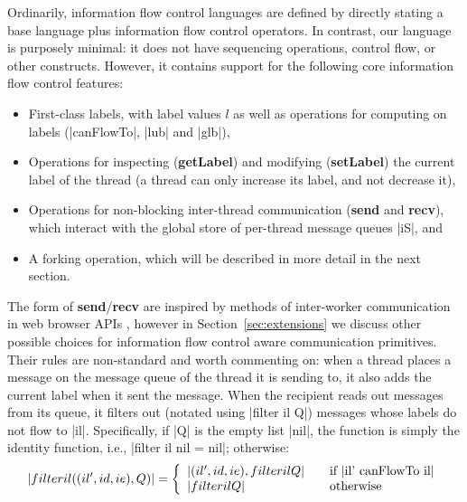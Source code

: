 Ordinarily, information flow control languages are defined by directly
stating a base language plus information flow control operators.  In
contrast, our language is purposely minimal: it does not have sequencing
operations, control flow, or other constructs.  However, it contains
support for the following core information flow control features:

\begin{itemize}
    \item First-class labels, with label values $l$ as well as operations for computing on
labels (|canFlowTo|, |lub| and |glb|),
    \item Operations for inspecting (\textbf{getLabel}) and modifying (\textbf{setLabel}) the current label of the thread (a thread can only increase its label, and not decrease it),
    \item Operations for non-blocking inter-thread communication (\textbf{send} and \textbf{recv}),
        which interact with the global store of per-thread message queues |iS|, and
    \item A forking operation, which will be described in more detail in the next section.
\end{itemize}

The form of \textbf{send}/\textbf{recv} are inspired by methods of inter-worker communication
in web browser APIs , however in Section~\ref{sec:extensions} we
discuss other possible choices for information flow control aware communication
primitives.  Their rules are non-standard and worth commenting on: when a thread places
a message on the message queue of the thread it is sending to, it also adds the current
label when it sent the message.  When the recipient reads out messages from its queue,
it filters out (notated using |filter il Q|) messages whose labels do not
flow to |il|. Specifically, if |Q| is the empty list |nil|, the
function is simply the identity function, i.e.,
|filter il nil = nil|; otherwise:
\[
|filter il ((il', id, ie) , Q )| = \left\{
\begin{array}{l l}
|(il', id, ie) , filter il Q| & \quad \text{if |il' canFlowTo il|}\\
|filter il Q| & \quad \text{otherwise}
\end{array} \right.
\]


